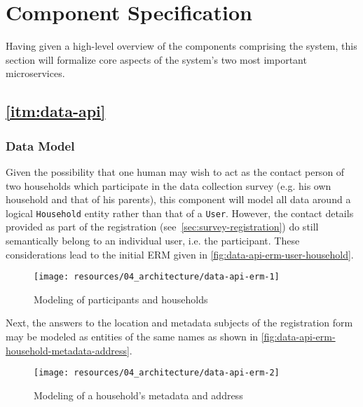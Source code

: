 \section{Component Specification}
\label{sec:component-specification}

Having given a high-level overview of the components comprising the system, this section will formalize core aspects of the system's two most important microservices.

\subsection{\ref{itm:data-api}}
\label{sec:component-specification-data-api}

\subsubsection{Data Model}
\label{sec:data-api-data-model}

Given the possibility that one human may wish to act as the contact person of two households which participate in the data collection survey (e.g. his own household and that of his parents), this component will model all data around a logical \texttt{Household} entity rather than that of a \texttt{User}. However, the contact details provided as part of the registration (see~\autoref{sec:survey-registration}) do still semantically belong to an individual user, i.e. the participant. These considerations lead to the initial \ac{ERM} given in \autoref{fig:data-api-erm-user-household}.

\begin{figure}[hbt]
  \centering
  \texttt{[image: resources/04\_architecture/data-api-erm-1]}
  \caption{Modeling of participants and households}
  \label{fig:data-api-erm-user-household}
\end{figure}

\FloatBarrier

Next, the answers to the location and metadata subjects of the registration form may be modeled as entities of the same names as shown in \autoref{fig:data-api-erm-household-metadata-address}.

\begin{figure}[hbt]
  \centering
  \texttt{[image: resources/04\_architecture/data-api-erm-2]}
  \caption{Modeling of a household's metadata and address}
  \label{fig:data-api-erm-household-metadata-address}
\end{figure}

